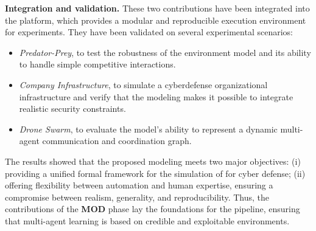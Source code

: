 \medskip
\noindent
\textbf{Integration and validation.}
These two contributions have been integrated into the  platform, which provides a modular and reproducible execution environment for experiments.
They have been validated on several experimental scenarios:
\begin{itemize}
\item \textit{Predator-Prey}, to test the robustness of the environment model and its ability to handle simple competitive interactions.

\item \textit{Company Infrastructure}, to simulate a cyberdefense organizational infrastructure and verify that the modeling makes it possible to integrate realistic security constraints.
\item \textit{Drone Swarm}, to evaluate the model's ability to represent a dynamic multi-agent communication and coordination graph.
\end {itemize}
\noindent
The results showed that the proposed modeling meets two major objectives:
(i) providing a unified formal framework for the simulation of  for cyber defense;
(ii) offering flexibility between automation and human expertise, ensuring a compromise between realism, generality, and reproducibility.
Thus, the contributions of the \textbf{MOD} phase lay the foundations for the  pipeline, ensuring that multi-agent learning is based on credible and exploitable environments.

